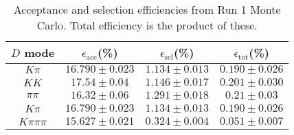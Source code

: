 \begin{table}[H]
    \centering
    \begin{tabular}{cccc}
        \toprule
        $D$ mode & $\epsilon_\mathrm{acc}$(\%) &  $\epsilon_\mathrm{sel}$(\%) &  $\epsilon_\mathrm{tot}$(\%) \\
        \midrule
        $K\pi$ & $16.790 \pm 0.023$ & $1.134 \pm 0.013$ & $0.190 \pm 0.026$ \\
        $KK$ & $17.54 \pm 0.04$ & $1.146 \pm 0.017$ & $0.201 \pm 0.030$ \\
        $\pi\pi$ & $16.32 \pm 0.06$ & $1.291 \pm 0.018$ & $0.21 \pm 0.03$ \\
        $K\pi$ & $16.790 \pm 0.023$ & $1.134 \pm 0.013$ & $0.190 \pm 0.026$ \\
        $K\pi\pi\pi$ & $15.627 \pm 0.021$ & $0.324 \pm 0.004$ & $0.051 \pm 0.007$ \\
        \bottomrule
    \end{tabular}
    \caption{Acceptance and selection efficiencies from  Run 1 Monte Carlo. Total efficiency is the  product of these.}
\label{tab:selection_efficiency_run1}
\end{table}
